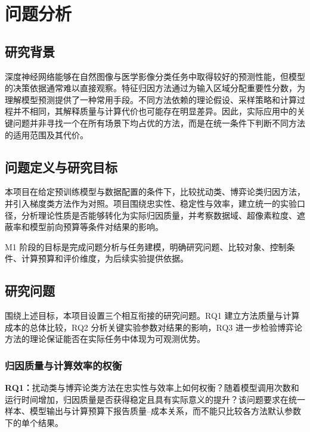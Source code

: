 
\chapter{问题分析}

\section{研究背景}

深度神经网络能够在自然图像与医学影像分类任务中取得较好的预测性能，但模型的决策依据通常难以直接观察。特征归因方法通过为输入区域分配重要性分数，为理解模型预测提供了一种常用手段。不同方法依赖的理论假设、采样策略和计算过程并不相同，其解释质量与计算代价也可能存在明显差异。因此，实际应用中的关键问题并非寻找一个在所有场景下均占优的方法，而是在统一条件下判断不同方法的适用范围及其代价。

\section{问题定义与研究目标}

本项目在给定预训练模型与数据配置的条件下，比较扰动类、博弈论类归因方法，并引入梯度类方法作为对照。项目围绕忠实性、稳定性与效率，建立统一的实验口径，分析理论性质是否能够转化为实际归因质量，并考察数据域、超像素粒度、遮蔽率和模型前向预算等条件对结果的影响。

M1 阶段的目标是完成问题分析与任务建模，明确研究问题、比较对象、控制条件、计算预算和评价维度，为后续实验提供依据。

\section{研究问题}

围绕上述目标，本项目设置三个相互衔接的研究问题。RQ1 建立方法质量与计算成本的总体比较，RQ2 分析关键实验参数对结果的影响，RQ3 进一步检验博弈论方法的理论保证能否在实际任务中体现为可观测优势。

\subsection{归因质量与计算效率的权衡}

\textbf{RQ1：}扰动类与博弈论类方法在忠实性与效率上如何权衡？随着模型调用次数和运行时间增加，归因质量是否获得稳定且具有实际意义的提升？该问题要求在统一样本、模型输出与计算预算下报告质量--成本关系，而不能只比较各方法默认参数下的单个结果。

